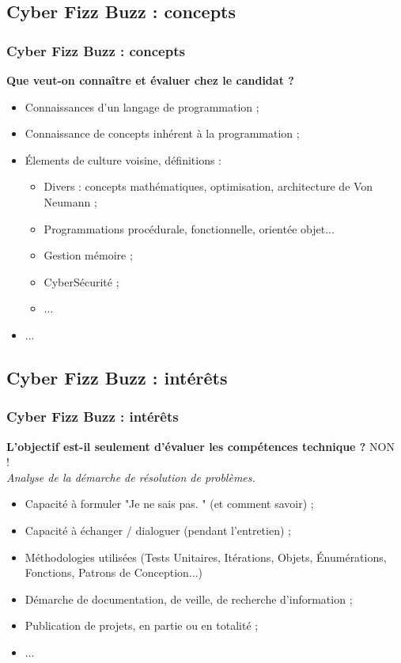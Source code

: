 \documentclass[slidetop,11pt]{beamer}
\begin{document}
\subsection{Cyber Fizz Buzz : concepts}
\begin{frame}
	\frametitle{Cyber Fizz Buzz : concepts}
	
	\textbf{Que veut-on conna{\^i}tre et {\'e}valuer chez le candidat ?}~\\
	
	\begin{itemize}
		\item Connaissances d'un langage de programmation ; 
		\item Connaissance de concepts inh{\'e}rent {\`a} la programmation ; 
		\item {\'E}lements de culture voisine, d{\'e}finitions : 
		\begin{itemize}
			\item Divers : concepts math{\'e}matiques, optimisation, architecture de Von Neumann ; 
			\item Programmations proc{\'e}durale, fonctionnelle, orient{\'e}e objet...
			\item Gestion m{\'e}moire ; 
			\item CyberS{\'e}curit{\'e} ; 
			\item ... 
		\end{itemize}
		\item ... 
	\end{itemize}
\end{frame} 

\subsection{Cyber Fizz Buzz : int{\'e}r{\^e}ts}
\begin{frame}
	\frametitle{Cyber Fizz Buzz : int{\'e}r{\^e}ts}
	
	\textbf{L'objectif est-il seulement d'{\'e}valuer les comp{\'e}tences technique ?} NON !~\\
	\emph{Analyse de la d{\'e}marche de r{\'e}solution de probl{\`e}mes. }
	
	\begin{itemize}
		\item Capacit{\'e} {\`a} formuler "Je ne sais pas. " (et comment savoir) ; 
		\item Capacit{\'e} {\`a} {\'e}changer / dialoguer (pendant l'entretien) ; 
		\item M{\'e}thodologies utilis{\'e}es (Tests Unitaires, It{\'e}rations, Objets, {\'E}num{\'e}rations, Fonctions, Patrons de Conception...)
		\item D{\'e}marche de documentation, de veille, de recherche d'information ; 
		\item Publication de projets, en partie ou en totalit{\'e} ; 
		\item ... 
	\end{itemize}
\end{frame} 
\end{document}

